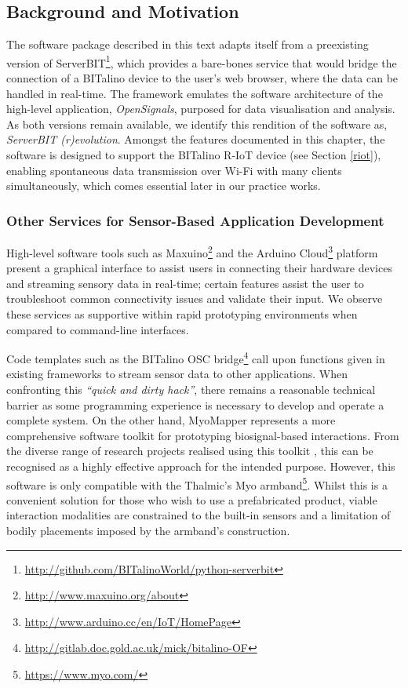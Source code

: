 \subsection{Background and Motivation}

The software package described in this text adapts itself from a preexisting version of ServerBIT\footnote{\url{http://github.com/BITalinoWorld/python-serverbit}}, which provides a bare-bones service that would bridge the connection of a BITalino device to the user’s web browser, where the data can be handled in real-time. The framework emulates the software architecture of the high-level application, \textit{OpenSignals}, purposed for data visualisation and analysis. As both versions remain available, we identify this rendition of the software as, \textit{ServerBIT (r)evolution}. Amongst the features documented in this chapter, the software is designed to support the BITalino R-IoT device (see Section \ref{riot}), enabling spontaneous data transmission over Wi-Fi with many clients simultaneously, which comes essential later in our practice works.

\subsubsection*{Other Services for Sensor-Based Application Development} \label{services}
High-level software tools such as Maxuino\footnote[2]{\url{http://www.maxuino.org/about}} and the Arduino Cloud\footnote[3]{\url{http://www.arduino.cc/en/IoT/HomePage}} platform present a graphical interface to assist users in connecting their hardware devices and streaming sensory data in real-time; certain features assist the user to troubleshoot common connectivity issues and validate their input. We observe these services as supportive within rapid prototyping environments when compared to command-line interfaces.

Code templates such as the BITalino OSC bridge\footnote[4]{\url{http://gitlab.doc.gold.ac.uk/mick/bitalino-OF}} call upon functions given in existing frameworks to stream sensor data to other applications. When confronting this \textit{``quick and dirty hack''}, there remains a reasonable technical barrier as some programming experience is necessary to develop and operate a complete system. On the other hand, MyoMapper \cite{donato_myo_nodate}  represents a more comprehensive software toolkit for prototyping biosignal-based interactions. From the diverse range of research projects realised using this toolkit \cite{brown_simple_2018,bullock_approaches_2016,di_donato_accessible_2019}, this can be recognised as a highly effective approach for the intended purpose. However, this software is only compatible with the Thalmic's Myo armband\footnote{\url{https://www.myo.com/}}. Whilst this is a convenient solution for those who wish to use a prefabricated product, viable interaction modalities are constrained to the built-in sensors and a limitation of bodily placements imposed by the armband's construction.

